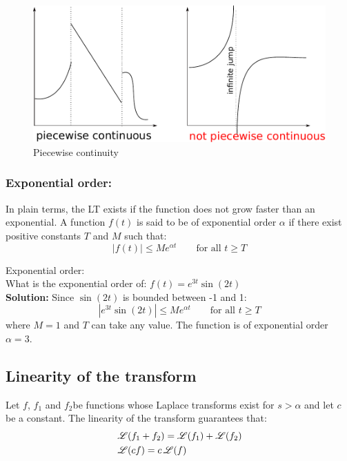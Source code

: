\begin{figure}
\includegraphics[width=\textwidth]{figs/piecewiseCont.pdf}
\caption{Piecewise continuity}
\end{figure}

\subsubsection{Exponential order:} In plain terms, the LT exists if the function does not grow faster than an exponential. A function $f(t)$ is said to be of exponential order $\alpha$ if there exist positive constants $T$ and $M$ such that:
\begin{equation*}
\left|f(t)\right|\leq Me^{\alpha t} \qquad \text{for all } t\geq T
\end{equation*}
\begin{exmp}{Exponential order:}\\
What is the exponential order of: $f(t)=e^{3t}\sin(2t)$\\
\textbf{Solution:} 
Since $\sin(2t)$ is bounded between -1 and 1:
\begin{equation*}
\left|e^{3t}\sin(2t)\right|\leq Me^{\alpha t} \qquad \text{for all } t\geq T
\end{equation*}
where $M=1$ and $T$ can take any value. The function is of exponential order $\alpha=3$.
\end{exmp}


\subsection{Linearity of  the transform}
Let $f$, $f_1$ and $f_2$be functions whose Laplace transforms exist for $s>\alpha$ and let $c$ be a constant. The linearity of the transform guarantees that:
\begin{align*}
&\operatorname{\mathscr{L}} (f_1+f_2)=\operatorname{\mathscr{L}}(f_1)+\operatorname{\mathscr{L}}(f_2)\\
&\operatorname{\mathscr{L}} (cf)=c\operatorname{\mathscr{L}}(f)
\end{align*}

